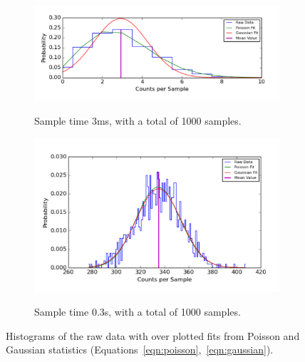 \documentclass[a4paper,12pt]{article}
\begin{document}
\begin{figure}[ht]
\centering
\begin{subfigure}{\textwidth}
  \centering
  \includegraphics[width=\linewidth]{3ms_section8_2_crop1.pdf}
  \label{fig:section8ms}
  \vspace{-0.25in}
  \caption{Sample time 3ms, with a total of 1000 samples.}
\end{subfigure}%
\qquad
\begin{subfigure}{\textwidth}
  \centering
  \includegraphics[width=\linewidth]{s_section8_2_crop1.pdf} 
  \label{fig:section8s}
  \vspace{-0.25in}
  \caption{Sample time 0.3s, with a total of 1000 samples.}
\end{subfigure}%
\caption{Histograms of the raw data with over plotted fits from Poisson and Gaussian statistics (Equations~\ref{eqn:poisson},~\ref{eqn:gaussian}).}
\label{fig:section8}
\end{figure}
\end{document}
